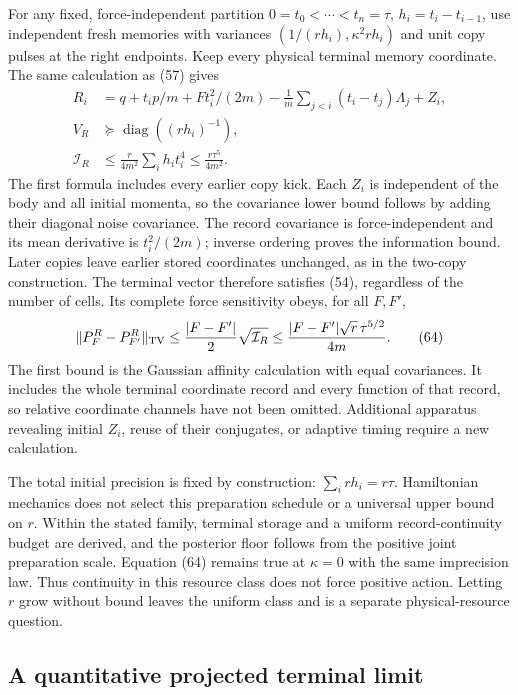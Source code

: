 \documentclass[11pt,a4paper]{article}
\begin{document}
For any fixed, force-independent partition \(0=t_0<\cdots<t_n=\tau\),
\(h_i=t_i-t_{i-1}\), use independent fresh memories with variances
\((1/(rh_i),\kappa^2rh_i)\) and unit copy pulses at the right endpoints.
Keep every physical terminal memory coordinate. The same calculation as
(57) gives \[\begin{aligned}
R_i&=q+t_i p/m+Ft_i^2/(2m)
       -\frac1m\sum_{j<i}(t_i-t_j)\Lambda_j+Z_i,\\
V_R&\succeq\operatorname{diag}((rh_i)^{-1}),\\
\mathcal I_R&\le\frac r{4m^2}\sum_i h_i t_i^4
                      \le\frac{r\tau^5}{4m^2}.
\end{aligned}\tag{63}\] The first formula includes every earlier copy
kick. Each \(Z_i\) is independent of the body and all initial momenta,
so the covariance lower bound follows by adding their diagonal noise
covariance. The record covariance is force-independent and its mean
derivative is \(t_i^2/(2m)\); inverse ordering proves the information
bound. Later copies leave earlier stored coordinates unchanged, as in
the two-copy construction. The terminal vector therefore satisfies (54),
regardless of the number of cells. Its complete force sensitivity obeys,
for all \(F,F'\), \[\|P_F^R-P_{F'}^R\|_{\rm TV}
\le\frac{|F-F'|}{2}\sqrt{\mathcal I_R}
\le\frac{|F-F'|\sqrt r\,\tau^{5/2}}{4m}.\tag{64}\] The first bound is
the Gaussian affinity calculation with equal covariances. It includes
the whole terminal coordinate record and every function of that record,
so relative coordinate channels have not been omitted. Additional
apparatus revealing initial \(Z_i\), reuse of their conjugates, or
adaptive timing require a new calculation.

The total initial precision is fixed by construction:
\(\sum_i rh_i=r\tau\). Hamiltonian mechanics does not select this
preparation schedule or a universal upper bound on \(r\). Within the
stated family, terminal storage and a uniform record-continuity budget
are derived, and the posterior floor follows from the positive joint
preparation scale. Equation (64) remains true at \(\kappa=0\) with the
same imprecision law. Thus continuity in this resource class does not
force positive action. Letting \(r\) grow without bound leaves the
uniform class and is a separate physical-resource question.

\hypertarget{a-quantitative-projected-terminal-limit}{%
\subsection{A quantitative projected terminal
limit}\label{a-quantitative-projected-terminal-limit}}
\end{document}
